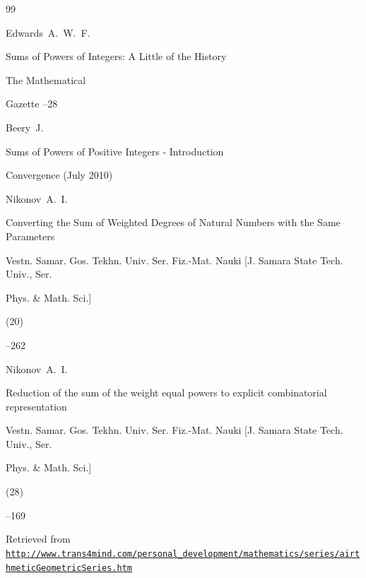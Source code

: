 \begin{thebibliography}{99}

\by Edwards~A.~W.~F. 

\paper Sums of Powers of Integers: A Little of the History 

\jour The Mathematical

Gazette    --28





\by Beery~J.

\preprint Sums of Powers of Positive Integers - Introduction

\preprintinfo Convergence (July 2010)






\by Nikonov~A.~I.

\paper Converting the Sum of Weighted Degrees of Natural Numbers with the Same Parameters

\jour Vestn. Samar. Gos. Tekhn. Univ. Ser. Fiz.-Mat. Nauki  \rm [J. Samara State Tech. Univ., Ser.

Phys. \& Math. Sci.]


(20)

--262





\by Nikonov~A.~I.

\paper Reduction of the sum of the weight equal powers to explicit combinatorial representation

\jour Vestn. Samar. Gos. Tekhn. Univ. Ser. Fiz.-Mat. Nauki \rm [J. Samara State Tech. Univ., Ser.

Phys. \& Math. Sci.]


(28)

--169





\elink  Retrieved from  \href{http://www.trans4mind.com/personal_development/mathematics/series/airthmeticGeometricSeries.htm}{\tt http://www.trans4mind.com/personal\_development/mathematics/series/airthmetic\-GeometricSeries.htm}


\end{thebibliography}
